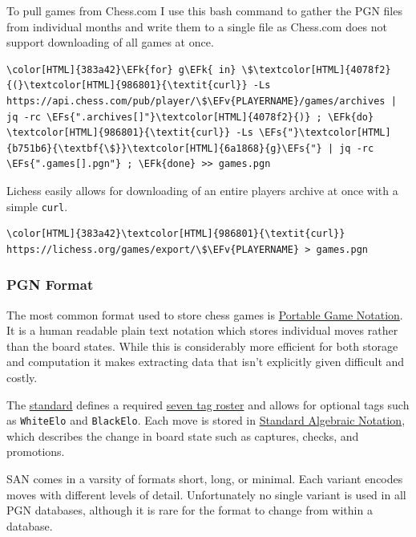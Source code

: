 \documentclass[11pt]{article}
\newcommand{\EFk}[1]{\textcolor{EFk}{#1}} %
\newcommand{\EFs}[1]{\textcolor{EFs}{#1}} %
\newcommand{\EFv}[1]{\textcolor{EFv}{#1}} %
\begin{document}
To pull games from Chess.com I use this bash command to gather the PGN files from individual months and write them to a single file as Chess.com does not support downloading of all games at once.
\begin{Code}
\begin{Verbatim}[]
\color[HTML]{383a42}\EFk{for} g\EFk{ in} \$\textcolor[HTML]{4078f2}{(}\textcolor[HTML]{986801}{\textit{curl}} -Ls https://api.chess.com/pub/player/\$\EFv{PLAYERNAME}/games/archives | jq -rc \EFs{".archives[]"}\textcolor[HTML]{4078f2}{)} ; \EFk{do} \textcolor[HTML]{986801}{\textit{curl}} -Ls \EFs{"}\textcolor[HTML]{b751b6}{\textbf{\$}}\textcolor[HTML]{6a1868}{g}\EFs{"} | jq -rc \EFs{".games[].pgn"} ; \EFk{done} >> games.pgn
\end{Verbatim}
\end{Code}

Lichess easily allows for downloading of an entire players archive at once with
a simple \texttt{curl}.
\begin{Code}
\begin{Verbatim}[]
\color[HTML]{383a42}\textcolor[HTML]{986801}{\textit{curl}} https://lichess.org/games/export/\$\EFv{PLAYERNAME} > games.pgn
\end{Verbatim}
\end{Code}
\subsubsection{PGN Format}
\label{sec:org756c669}
The most common format used to store chess games is \href{https://en.wikipedia.org/wiki/Portable\_Game\_Notation}{Portable Game Notation}. It is a human readable plain text notation which stores individual moves rather than the board states. While this is considerably more efficient for both storage and computation it makes extracting data that isn't explicitly given difficult and costly.

The \href{http://www.saremba.de/chessgml/standards/pgn/pgn-complete.htm}{standard} defines a required \href{http://www.saremba.de/chessgml/standards/pgn/pgn-complete.htm\#c8.1.1}{seven tag roster} and allows for optional tags such as \texttt{WhiteElo} and \texttt{BlackElo}. Each move is stored in \href{https://en.wikipedia.org/wiki/Algebraic\_notation\_(chess)}{Standard Algebraic Notation}, which describes the change in board state such as captures, checks, and promotions.

SAN comes in a varsity of formats short, long, or minimal. Each variant encodes moves with different levels of detail. Unfortunately no single variant is used in all PGN databases, although it is rare for the format to change from within a database.
\end{document}
